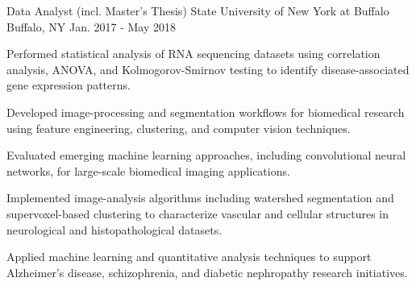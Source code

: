 \begin{cventries}
  \cventry
    {Data Analyst (incl. Master's Thesis)} %
    {State University of New York at Buffalo} %
    {Buffalo, NY} %
    {Jan. 2017 - May 2018} %
    {
      \begin{cvitems} %
        \item {Performed statistical analysis of RNA sequencing datasets using correlation analysis, ANOVA, and Kolmogorov-Smirnov testing to identify disease-associated gene expression patterns.}
        \item {Developed image-processing and segmentation workflows for biomedical research using feature engineering, clustering, and computer vision techniques.}
        \item {Evaluated emerging machine learning approaches, including convolutional neural networks, for large-scale biomedical imaging applications.}
        \item {Implemented image-analysis algorithms including watershed segmentation and supervoxel-based clustering to characterize vascular and cellular structures in neurological and histopathological datasets.}
        \item {Applied machine learning and quantitative analysis techniques to support Alzheimer's disease, schizophrenia, and diabetic nephropathy research initiatives.}
      \end{cvitems}
    }

\end{cventries}
